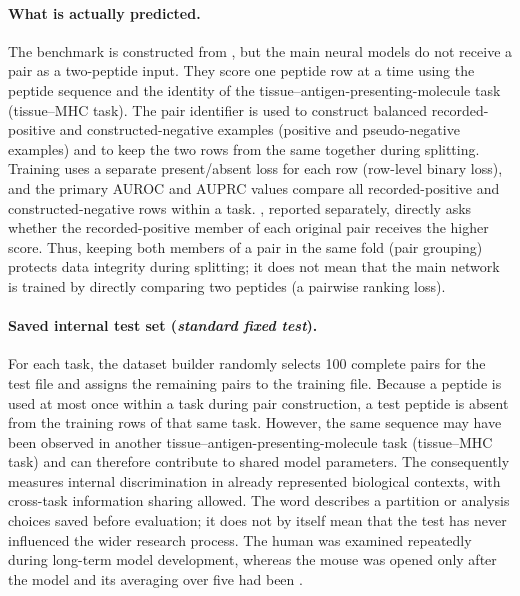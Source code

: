 \paragraph{What is actually predicted.}
The benchmark is constructed from \plainMatchedPairs{}, but the main neural models do not receive a pair as a two-peptide input. They score one peptide row at a time using the peptide sequence and the identity of the tissue--antigen-presenting-molecule task (tissue--MHC task). The pair identifier is used to construct balanced recorded-positive and constructed-negative examples (positive and pseudo-negative examples) and to keep the two rows from the same \plainMatchedPair{} together during splitting. Training uses a separate present/absent loss for each row (row-level binary loss), and the primary AUROC and AUPRC values compare all recorded-positive and constructed-negative rows within a task. \plainPairAcc{}, reported separately, directly asks whether the recorded-positive member of each original pair receives the higher score. Thus, keeping both members of a pair in the same fold (pair grouping) protects data integrity during splitting; it does not mean that the main network is trained by directly comparing two peptides (a pairwise ranking loss).

\paragraph{Saved internal test set (\emph{standard fixed test}).}
For each task, the dataset builder randomly selects 100 complete pairs for the test file and assigns the remaining pairs to the training file. Because a peptide is used at most once within a task during pair construction, a test peptide is absent from the training rows of that same task. However, the same sequence may have been observed in another tissue--antigen-presenting-molecule task (tissue--MHC task) and can therefore contribute to shared model parameters. The \plainFixedTest{} consequently measures internal discrimination in already represented biological contexts, with cross-task information sharing allowed. The word \plainFrozen{} describes a partition or analysis choices saved before evaluation; it does not by itself mean that the test has never influenced the wider research process. The human \plainFixedTest{} was examined repeatedly during long-term model development, whereas the mouse \plainFixedTest{} was opened only after the model and its averaging over five \plainSeeds{} had been \plainFrozen{}.

